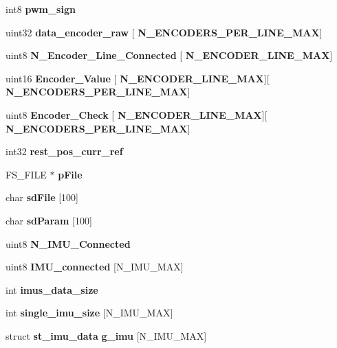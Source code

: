 \begin{DoxyCompactItemize}
\item 
int8 \textbf{ pwm\+\_\+sign}
\item 
\mbox{\label{globals_8h_a5190337b2d433e192edc68cf3d603ede}} 
uint32 {\bfseries data\+\_\+encoder\+\_\+raw} [\textbf{ N\+\_\+\+E\+N\+C\+O\+D\+E\+R\+S\+\_\+\+P\+E\+R\+\_\+\+L\+I\+N\+E\+\_\+\+M\+AX}]
\item 
\mbox{\label{globals_8h_ae62a59fe712aba1b45a5358ece0b3d35}} 
uint8 {\bfseries N\+\_\+\+Encoder\+\_\+\+Line\+\_\+\+Connected} [\textbf{ N\+\_\+\+E\+N\+C\+O\+D\+E\+R\+\_\+\+L\+I\+N\+E\+\_\+\+M\+AX}]
\item 
\mbox{\label{globals_8h_a7bf300fb19b8dd8db6783ef124605540}} 
uint16 {\bfseries Encoder\+\_\+\+Value} [\textbf{ N\+\_\+\+E\+N\+C\+O\+D\+E\+R\+\_\+\+L\+I\+N\+E\+\_\+\+M\+AX}][\textbf{ N\+\_\+\+E\+N\+C\+O\+D\+E\+R\+S\+\_\+\+P\+E\+R\+\_\+\+L\+I\+N\+E\+\_\+\+M\+AX}]
\item 
\mbox{\label{globals_8h_a269cff8427d6a8902a38dc258d649f06}} 
uint8 {\bfseries Encoder\+\_\+\+Check} [\textbf{ N\+\_\+\+E\+N\+C\+O\+D\+E\+R\+\_\+\+L\+I\+N\+E\+\_\+\+M\+AX}][\textbf{ N\+\_\+\+E\+N\+C\+O\+D\+E\+R\+S\+\_\+\+P\+E\+R\+\_\+\+L\+I\+N\+E\+\_\+\+M\+AX}]
\item 
int32 \textbf{ rest\+\_\+pos\+\_\+curr\+\_\+ref}
\item 
\mbox{\label{globals_8h_a28568209e5c79332f574608aafcd14ec}} 
F\+S\+\_\+\+F\+I\+LE $\ast$ {\bfseries p\+File}
\item 
\mbox{\label{globals_8h_a93ea3c816e507e10c5a48cb79d624863}} 
char {\bfseries sd\+File} [100]
\item 
\mbox{\label{globals_8h_ad49779e5c549cf4cb332a929eacc6b71}} 
char {\bfseries sd\+Param} [100]
\item 
\mbox{\label{globals_8h_a47118db87acd24ae6dac18b036f360ec}} 
uint8 {\bfseries N\+\_\+\+I\+M\+U\+\_\+\+Connected}
\item 
\mbox{\label{globals_8h_a99668f3210aba0be3baec19486621bce}} 
uint8 {\bfseries I\+M\+U\+\_\+connected} [N\+\_\+\+I\+M\+U\+\_\+\+M\+AX]
\item 
\mbox{\label{globals_8h_a86272fcfcab512d38a11824196df4bbc}} 
int {\bfseries imus\+\_\+data\+\_\+size}
\item 
\mbox{\label{globals_8h_aca96c483c3e269e3805aa861ced0aef5}} 
int {\bfseries single\+\_\+imu\+\_\+size} [N\+\_\+\+I\+M\+U\+\_\+\+M\+AX]
\item 
\mbox{\label{globals_8h_ab72cce926a6439eda41315f45a9c379c}} 
struct \textbf{ st\+\_\+imu\+\_\+data} {\bfseries g\+\_\+imu} [N\+\_\+\+I\+M\+U\+\_\+\+M\+AX]
\item 

\end{DoxyCompactItemize}
